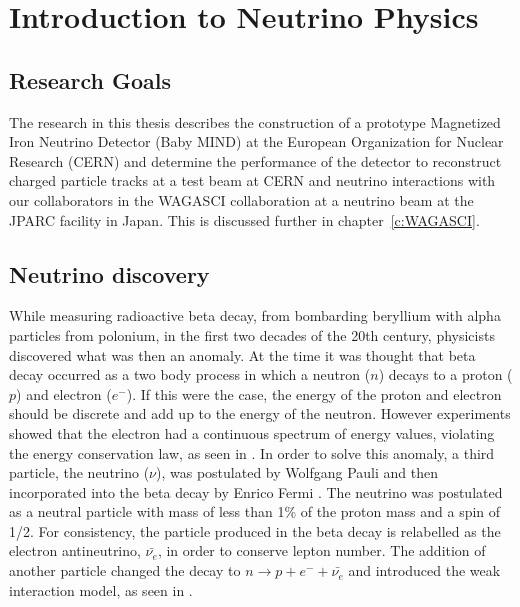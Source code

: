 \chapter{Introduction to Neutrino Physics}
\label{c:theoryIntro}

\section{Research Goals}
The research in this thesis describes the construction of a prototype Magnetized Iron Neutrino Detector (Baby MIND) at the European Organization for Nuclear Research (CERN) and determine the performance of the detector to reconstruct charged particle tracks at a test beam at CERN and neutrino interactions with our collaborators in the WAGASCI collaboration at a neutrino beam at the JPARC facility in Japan. This is discussed further in chapter~\ref{c:WAGASCI}.


\section{Neutrino discovery}\label{section:Theory}
While measuring radioactive beta decay, from bombarding beryllium with alpha particles from polonium, in the first two decades of the 20th century, physicists discovered what was then an anomaly. At the time it was thought that beta decay occurred as a two body process in which a neutron ($n$) decays to a proton ($p$) and electron ($e^-$). If this were the case, the energy of the proton and electron should be discrete and add up to the energy of the neutron. However experiments showed that the electron had a continuous spectrum of energy values, violating the energy conservation law, as seen in . In order to solve this anomaly, a third particle, the neutrino ($\nu$), was postulated by Wolfgang Pauli \cite{4Pauli:Online} and then incorporated into the beta decay by Enrico Fermi \cite{5Wilson}. The neutrino was postulated as a neutral particle with mass of less than 1\% of the proton mass and a spin of 1/2. For consistency, the particle produced in the beta decay is relabelled as the electron antineutrino, $\bar{\nu_e}$, in order to conserve lepton number. The addition of another particle changed the decay to $n \rightarrow p + e^- + \bar{\nu_e}$ and introduced the weak interaction model, as seen in . 

